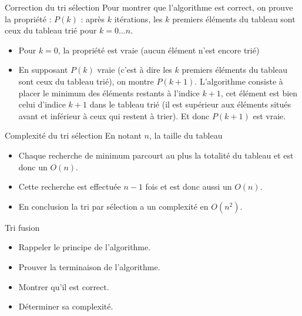 \documentclass[10pt]{beamer}
\begin{document}
\begin{frame}[fragile]{\Ctitle}{\stitle}
    \begin{exampleblock}{Correction du tri sélection}
        \textcolor{OliveGreen}{Pour montrer que l'algorithme est correct, on prouve  la propriété : $P(k)$ : \og{} après $k$ itérations, les $k$ premiers éléments du tableau sont ceux du tableau trié pour $k=0 \dots n$.}
        \begin{itemize}
            \item<2->\textcolor{OliveGreen}{Pour $k=0$, la propriété est vraie (aucun élément n'est encore trié)}
            \item<3->\textcolor{OliveGreen}{En supposant $P(k)$ vraie (c'est à dire les $k$ premiers éléments du tableau sont ceux du tableau trié), on montre $P(k+1)$. L'algorithme consiste à placer le minimum des éléments restants à l'indice $k+1$, cet élément est bien celui d'indice $k+1$ dans le tableau trié (il est supérieur aux éléments situés avant et inférieur à ceux qui restent à trier). Et donc $P(k+1)$ est vraie.}
        \end{itemize}
    \end{exampleblock}
\end{frame}

\begin{frame}[fragile]{\Ctitle}{\stitle}
    \begin{exampleblock}{Complexité du tri sélection}
        En notant $n$, la taille du tableau
        \begin{itemize}
            \item<1-> Chaque recherche de minimum parcourt au plus la totalité du tableau et est donc un $O(n)$.
            \item<2-> Cette recherche est effectuée $n-1$ fois et est donc aussi un $O(n)$.
            \item<3-> En conclusion la tri par sélection a un complexité en $O(n^2)$.
        \end{itemize}
    \end{exampleblock}
\end{frame}

\begin{frame}[fragile]{\Ctitle}{\stitle}
    \begin{exampleblock}{Tri fusion}
        \begin{itemize}
            \item<1-> Rappeler le principe de l'algorithme.
            \item<2-> Prouver la terminaison de l'algorithme.
            \item<3-> Montrer qu'il est correct.
            \item<4-> Déterminer sa complexité.
        \end{itemize}
    \end{exampleblock}
\end{frame}
\end{document}
